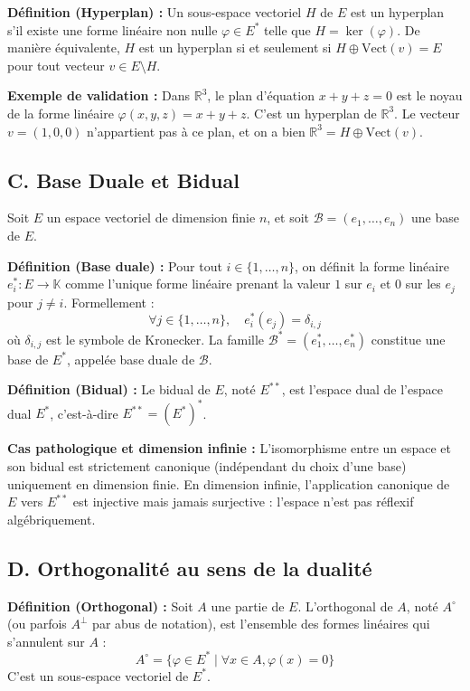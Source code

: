 \documentclass{report}
\begin{document}
\textbf{Définition (Hyperplan) :}
Un sous-espace vectoriel $H$ de $E$ est un hyperplan s'il existe une forme linéaire non nulle $\varphi \in E^*$ telle que $H = \ker(\varphi)$.
De manière équivalente, $H$ est un hyperplan si et seulement si $H \oplus \text{Vect}(v) = E$ pour tout vecteur $v \in E \setminus H$.

\textbf{Exemple de validation :}
Dans $\mathbb{R}^3$, le plan d'équation $x + y + z = 0$ est le noyau de la forme linéaire $\varphi(x, y, z) = x + y + z$. C'est un hyperplan de $\mathbb{R}^3$. Le vecteur $v = (1, 0, 0)$ n'appartient pas à ce plan, et on a bien $\mathbb{R}^3 = H \oplus \text{Vect}(v)$.

\subsection*{C. Base Duale et Bidual}

Soit $E$ un espace vectoriel de dimension finie $n$, et soit $\mathcal{B} = (e_1, \dots, e_n)$ une base de $E$.

\textbf{Définition (Base duale) :}
Pour tout $i \in \{1, \dots, n\}$, on définit la forme linéaire $e_i^* : E \to \mathbb{K}$ comme l'unique forme linéaire prenant la valeur $1$ sur $e_i$ et $0$ sur les $e_j$ pour $j \neq i$. Formellement :
$$ \forall j \in \{1, \dots, n\}, \quad e_i^*(e_j) = \delta_{i,j} $$
où $\delta_{i,j}$ est le symbole de Kronecker. La famille $\mathcal{B}^* = (e_1^*, \dots, e_n^*)$ constitue une base de $E^*$, appelée base duale de $\mathcal{B}$.

\textbf{Définition (Bidual) :}
Le bidual de $E$, noté $E^{**}$, est l'espace dual de l'espace dual $E^*$, c'est-à-dire $E^{**} = (E^*)^*$.

\textbf{Cas pathologique et dimension infinie :}
L'isomorphisme entre un espace et son bidual est strictement canonique (indépendant du choix d'une base) uniquement en dimension finie. En dimension infinie, l'application canonique de $E$ vers $E^{**}$ est injective mais jamais surjective : l'espace n'est pas réflexif algébriquement.

\subsection*{D. Orthogonalité au sens de la dualité}

\textbf{Définition (Orthogonal) :}
Soit $A$ une partie de $E$. L'orthogonal de $A$, noté $A^\circ$ (ou parfois $A^\perp$ par abus de notation), est l'ensemble des formes linéaires qui s'annulent sur $A$ :
$$ A^\circ = \{ \varphi \in E^* \mid \forall x \in A, \varphi(x) = 0 \} $$
C'est un sous-espace vectoriel de $E^*$.
\end{document}
